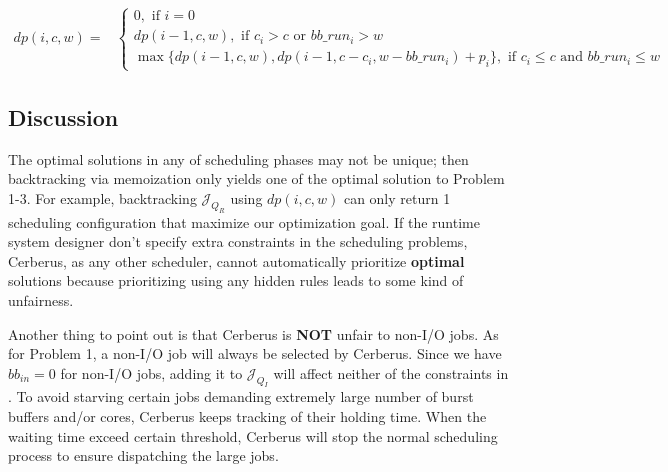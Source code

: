 \begin{strip}
        \begin{align}
                dp(i, c, w) = &
                \left\{
                        \begin{array}{l}
                                0, \text{ if $i=0$ } \\ [0.6em]
                                dp(i-1, c, w), \text{ if $c_i > c$ or $bb\_run_i > w$} \\ [0.6em]
                                \max \{ dp(i-1, c, w), dp(i-1, c - c_i, w - bb\_run_i) + p_i \}, \text{ if $c_i \leq c$ and $bb\_run_i \leq w$}
                        \end{array} 
                \right.
                \label{Equ:MaxProductRecursion}
        \end{align}
\end{strip}

\subsection{Discussion}
The optimal solutions in any of scheduling phases may not be unique;
then backtracking via memoization only yields one of the optimal solution to Problem 1-3.
For example, backtracking $\mathcal{J}_{Q_R}$ using $dp(i,c,w)$ can only return 1 scheduling
configuration that maximize our optimization goal.
If the runtime system designer don't specify extra constraints in the scheduling problems,
Cerberus, as any other scheduler, cannot automatically prioritize \textbf{optimal} solutions
because prioritizing using any hidden rules leads to some kind of unfairness.

Another thing to point out is that Cerberus is \textbf{NOT} unfair to non-I/O jobs.
As for Problem 1, a non-I/O job will always be selected by Cerberus.
Since we have $bb_{in} = 0$ for non-I/O jobs, adding it to $\mathcal{J}_{Q_I}$ will affect
neither of the constraints in .
To avoid starving certain jobs demanding extremely large number of burst buffers and/or cores,
Cerberus keeps tracking of their holding time.
When the waiting time exceed certain threshold, Cerberus will stop the normal scheduling
process to ensure dispatching the large jobs.



